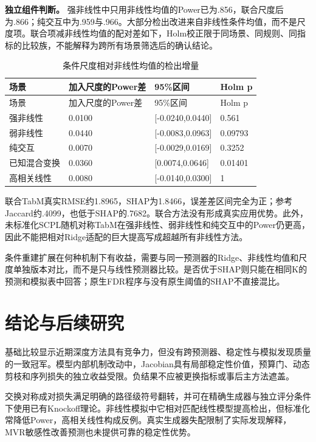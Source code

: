 \documentclass[UTF8,11pt,a4paper]{ctexart}
\begin{document}
\textbf{独立组件判断。} 强非线性中只用非线性均值的Power已为.856，联合尺度后为.866；纯交互中为.959与.966。大部分检出改进来自非线性条件均值，而不是尺度项。联合项减非线性均值的配对差如下，Holm校正限于同场景、同规则、同指标的比较族，不能解释为跨所有场景筛选后的确认结论。

{
\footnotesize
\begin{longtable}[]{@{}llll@{}}
\caption{条件尺度相对非线性均值的检出增量}\tabularnewline
\toprule\noalign{}
场景 & 加入尺度的Power差 & 95\%区间 & Holm p \\
\midrule\noalign{}
\endfirsthead
\toprule\noalign{}
场景 & 加入尺度的Power差 & 95\%区间 & Holm p \\
\midrule\noalign{}
\endhead
\bottomrule\noalign{}
\endlastfoot
强非线性 & 0.0100 & {[}-0.0240,0.0440{]} & 0.561 \\
弱非线性 & 0.0440 & {[}-0.0083,0.0963{]} & 0.09793 \\
纯交互 & 0.0070 & {[}-0.0029,0.0169{]} & 0.3252 \\
已知混合变换 & 0.0360 & {[}0.0074,0.0646{]} & 0.01401 \\
高相关线性 & 0.0080 & {[}-0.0140,0.0300{]} & 1 \\
\end{longtable}
}

联合TabM真实RMSE约1.8965，SHAP为1.8466，误差差区间完全为正；参考Jaccard约.4099，也低于SHAP的.7682。联合方法没有形成真实应用优势。此外，未标准化SCPL随机对称TabM在强非线性、弱非线性和纯交互中的Power仍更高，因此不能把相对Ridge适配的巨大提高写成超越所有非线性方法。

条件重建扩展在何种机制下有收益，需要与同一预测器的Ridge、非线性均值和尺度单独版本对比，而不是只与线性预测器比较。是否优于SHAP则只能在相同K的预测和模拟表中回答；原生FDR程序与没有原生阈值的SHAP不直接混比。

\section{结论与后续研究}

基础比较显示近期深度方法具有竞争力，但没有跨预测器、稳定性与模拟发现质量的一致冠军。模型内部机制改动中，Jacobian具有局部稳定性价值，预算门、动态剪枝和序列损失的独立收益受限。负结果不应被更换指标或事后主方法遮盖。

交换对称成对损失满足明确的路径级符号翻转，并可在精确生成器与独立评分条件下使用已有Knockoff理论。非线性模拟中它相对匹配线性模型提高检出，但标准化常降低Power，高相关线性构成反例。真实生成器失配限制了实际发现解释，MVR敏感性改善预测也未提供可靠的稳定性优势。
\end{document}
